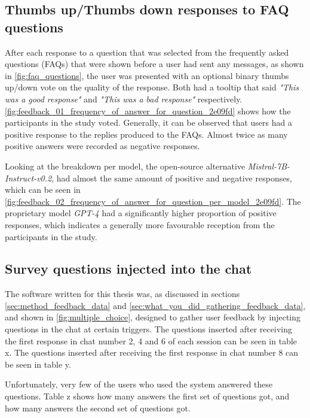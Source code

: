 \subsection{Thumbs up/Thumbs down responses to FAQ questions}


After each response to a question that was selected from the frequently asked questions (FAQs) that were shown before a user had sent any messages, as shown in \autoref{fig:faq_questions}, the user was presented with an optional binary thumbs up/down vote on the quality of the response. Both had a tooltip that said \textit{"This was a good response"} and \textit{"This was a bad response"} respectively. \autoref{fig:feedback_01_frequency_of_answer_for_question_2e09fd} shows how the participants in the study voted. Generally, it can be observed that users had a positive response to the replies produced to the FAQs. Almost twice as many positive answers were recorded as negative responses.


Looking at the breakdown per model, the open-source alternative \textit{Mistral-7B-Instruct-v0.2}, had almost the same amount of positive and negative responses, which can be seen in \autoref{fig:feedback_02_frequency_of_answer_for_question_per_model_2e09fd}. The proprietary model \textit{GPT-4} had a significantly higher proportion of positive responses, which indicates a generally more favourable reception from the participants in the study.








\subsection{Survey questions injected into the chat}


The software written for this thesis was, as discussed in sections \ref{sec:method_feedback_data} and \ref{sec:what_you_did_gathering_feedback_data}, and shown in \autoref{fig:multiple_choice}, designed to gather user feedback by injecting questions in the chat at certain triggers. The questions inserted after receiving the first response in chat number 2, 4 and 6 of each session can be seen in table x. The questions inserted after receiving the first response in chat number 8 can be seen in table y.


Unfortunately, very few of the users who used the system answered these questions. Table z shows how many answers the first set of questions got, and how many answers the second set of questions got.


